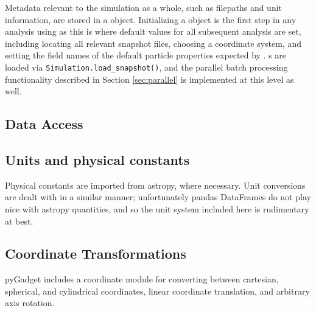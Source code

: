 \subsubsection{}
\label{sec:sim}
Metadata relevant to the simulation as a whole, such as filepaths and unit information, are stored in a  object.  Initializing a  object is the first step in any analysis using  as this is where default values for all subsequent analysis are set, including locating all relevant snapshot files, choosing a coordinate system, and setting the field names of the default particle properties expected by .  s are loaded via \verb|Simulation.load_snapshot()|, and the parallel batch processing functionality described in Section \ref{sec:parallel} is implemented at this level as well.

\subsection{Data Access}
\label{sec:fileIO}

\subsection{Units and physical constants}
\label{sec:units}
Physical constants are imported from astropy, where necessary.  Unit conversions are dealt with in a similar manner; unfortunately pandas DataFrames do not play nice with astropy quantities, and so the unit system included here is rudimentary at best.

\subsection{Coordinate Transformations}
\label{sec:coords}
pyGadget includes a coordinate module for converting between cartesian, spherical, and cylindrical coordinates, linear coordinate translation, and arbitrary axis rotation.
